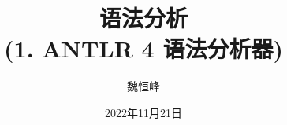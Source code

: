 \documentclass[]{beamer}
\title[语法分析]{语法分析 \\ (1. ANTLR 4 语法分析器)}
\author[魏恒峰]{\large 魏恒峰}
\institute{hfwei@nju.edu.cn}
\date{2022年11月21日}
\begin{document}
\maketitle
% 




\thankyou{}

\end{document}
